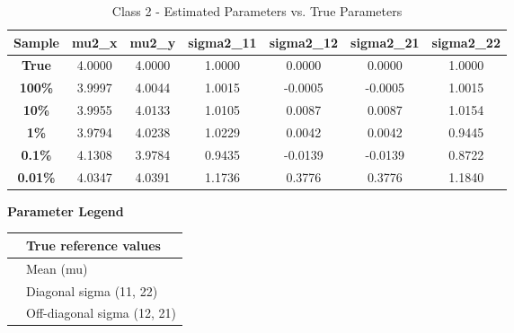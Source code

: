 \documentclass{article}
\begin{document}
\begin{table}[H]
\centering
\small
\caption{Class 2 - Estimated Parameters vs. True Parameters}
\vspace{-0.4em}
\begin{tabular}{ccccccc}
\toprule
\textbf{Sample} & \textbf{mu2\_x} & \textbf{mu2\_y} & \textbf{sigma2\_11} & \textbf{sigma2\_12} & \textbf{sigma2\_21} & \textbf{sigma2\_22} \\
\midrule
\textbf{True} & \cellcolor{trueyellow} 4.0000 & \cellcolor{trueyellow} 4.0000 & \cellcolor{trueyellow} 1.0000 & \cellcolor{trueyellow} 0.0000 & \cellcolor{trueyellow} 0.0000 & \cellcolor{trueyellow} 1.0000 \\
\textbf{100\%} & \cellcolor{meangreen} 3.9997 & \cellcolor{meangreen} 4.0044 & \cellcolor{sigmablue} 1.0015 & \cellcolor{offpurple} -0.0005 & \cellcolor{offpurple} -0.0005 & \cellcolor{sigmablue} 1.0015 \\
\textbf{10\%} & \cellcolor{meangreen} 3.9955 & \cellcolor{meangreen} 4.0133 & \cellcolor{sigmablue} 1.0105 & \cellcolor{offpurple} 0.0087 & \cellcolor{offpurple} 0.0087 & \cellcolor{sigmablue} 1.0154 \\
\textbf{1\%} & \cellcolor{meangreen} 3.9794 & \cellcolor{meangreen} 4.0238 & \cellcolor{sigmablue} 1.0229 & \cellcolor{offpurple} 0.0042 & \cellcolor{offpurple} 0.0042 & \cellcolor{sigmablue} 0.9445 \\
\textbf{0.1\%} & \cellcolor{meangreen} 4.1308 & \cellcolor{meangreen} 3.9784 & \cellcolor{sigmablue} 0.9435 & \cellcolor{offpurple} -0.0139 & \cellcolor{offpurple} -0.0139 & \cellcolor{sigmablue} 0.8722 \\
\textbf{0.01\%} & \cellcolor{meangreen} 4.0347 & \cellcolor{meangreen} 4.0391 & \cellcolor{sigmablue} 1.1736 & \cellcolor{offpurple} 0.3776 & \cellcolor{offpurple} 0.3776 & \cellcolor{sigmablue} 1.1840 \\
\bottomrule
\end{tabular}
\end{table}

\begin{center}
\textbf{Parameter Legend} \\
\begin{tabular}{|l|l|}
\hline
\cellcolor{trueyellow} & True reference values \\ \hline
\cellcolor{meangreen} & Mean (mu) \\ \hline
\cellcolor{sigmablue} & Diagonal sigma (11, 22) \\ \hline
\cellcolor{offpurple} & Off-diagonal sigma (12, 21) \\ \hline
\end{tabular}
\end{center}
\end{document}
